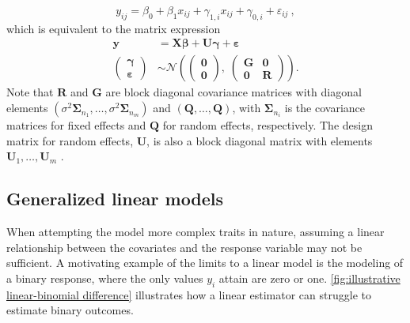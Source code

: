 \begin{equation*}
y_{ij} = \beta_0 + \beta_1 x_{ij} + \gamma_{1,i} x_{ij} + \gamma_{0,i} + \varepsilon_{ij} \ ,
\end{equation*}
which is equivalent to the matrix expression
\begin{align}
\bm y &= \bm X \bm \beta + \bm U \bm \gamma + \bm \varepsilon \\[1.5ex]
\left(\begin{matrix} \bm\gamma \\ \bm\varepsilon \end{matrix}\right)
&\sim \mathcal{N}\left(
\left(\begin{matrix} \bm{0} \\ \bm{0} \end{matrix} \right), \;
\left(\begin{matrix}
\bm G & \bm 0 \\
\bm 0 & \bm R
\end{matrix}\right)
\right). \nonumber
\label{eq:mixed model matrix}
\end{align}
Note that $\bm R$ and $\bm G$ are block diagonal covariance matrices with diagonal elements $(\sigma^2\bm\Sigma_{n_1}, \dots, \sigma^2\bm \Sigma_{n_m})$ and $(\bm Q, \dots, \bm Q)$, with $\bm \Sigma_{n_i}$ is the covariance matrices for fixed effects and $\bm Q$ for random effects, respectively. The design matrix for random effects, $\bm U$, is also a block diagonal matrix with elements $\bm U_1, \dots, \bm U_m$ \autocite{glm-book}. 


\subsection{Generalized linear models} \label{sec:theory:glms}
When attempting the model more complex traits in nature, assuming a linear relationship between the covariates and the response variable may not be sufficient. A motivating example of the limits to a linear model is the modeling of a binary response, where the only values $y_i$ attain are zero or one. \autoref{fig:illustrative linear-binomial difference} illustrates how a linear estimator can struggle to estimate binary outcomes.


